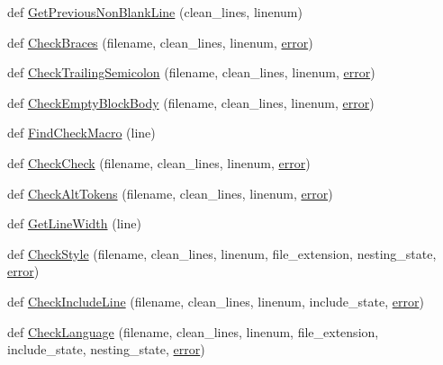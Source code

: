 \begin{DoxyCompactItemize}
\item 
def \hyperlink{namespacecpplint_a27743480b080a71eb8a0320da2ca0fa3}{Get\+Previous\+Non\+Blank\+Line} (clean\+\_\+lines, linenum)
\item 
def \hyperlink{namespacecpplint_a3f0a4d2ab1846bf487c742dc88946e3e}{Check\+Braces} (filename, clean\+\_\+lines, linenum, \hyperlink{_07copy_08_2_read_camera_model_8m_ac546fdc9911f4a876dbfaffbc7426f8b}{error})
\item 
def \hyperlink{namespacecpplint_a725663cb5a341fbf726f2ac8fa4e61a3}{Check\+Trailing\+Semicolon} (filename, clean\+\_\+lines, linenum, \hyperlink{_07copy_08_2_read_camera_model_8m_ac546fdc9911f4a876dbfaffbc7426f8b}{error})
\item 
def \hyperlink{namespacecpplint_a9c8aa68644d8cb55497a7d9cb8fb12d1}{Check\+Empty\+Block\+Body} (filename, clean\+\_\+lines, linenum, \hyperlink{_07copy_08_2_read_camera_model_8m_ac546fdc9911f4a876dbfaffbc7426f8b}{error})
\item 
def \hyperlink{namespacecpplint_aefff9c2eefe99656a226d11ce4d9b555}{Find\+Check\+Macro} (line)
\item 
def \hyperlink{namespacecpplint_afc5b544f640cd11be2665e6bb4646de7}{Check\+Check} (filename, clean\+\_\+lines, linenum, \hyperlink{_07copy_08_2_read_camera_model_8m_ac546fdc9911f4a876dbfaffbc7426f8b}{error})
\item 
def \hyperlink{namespacecpplint_a47f66a697e177c06b56491613fbc2d38}{Check\+Alt\+Tokens} (filename, clean\+\_\+lines, linenum, \hyperlink{_07copy_08_2_read_camera_model_8m_ac546fdc9911f4a876dbfaffbc7426f8b}{error})
\item 
def \hyperlink{namespacecpplint_ae55f74f34d41b59cf262511c5944209a}{Get\+Line\+Width} (line)
\item 
def \hyperlink{namespacecpplint_acfc546daa5947842cb01af319dcb482b}{Check\+Style} (filename, clean\+\_\+lines, linenum, file\+\_\+extension, nesting\+\_\+state, \hyperlink{_07copy_08_2_read_camera_model_8m_ac546fdc9911f4a876dbfaffbc7426f8b}{error})
\item 
def \hyperlink{namespacecpplint_add7eb8486a182205bb86de635db01384}{Check\+Include\+Line} (filename, clean\+\_\+lines, linenum, include\+\_\+state, \hyperlink{_07copy_08_2_read_camera_model_8m_ac546fdc9911f4a876dbfaffbc7426f8b}{error})
\item 
def \hyperlink{namespacecpplint_a6992d951cf4be06500f6b392ee6a8111}{Check\+Language} (filename, clean\+\_\+lines, linenum, file\+\_\+extension, include\+\_\+state, nesting\+\_\+state, \hyperlink{_07copy_08_2_read_camera_model_8m_ac546fdc9911f4a876dbfaffbc7426f8b}{error})

\end{DoxyCompactItemize}

